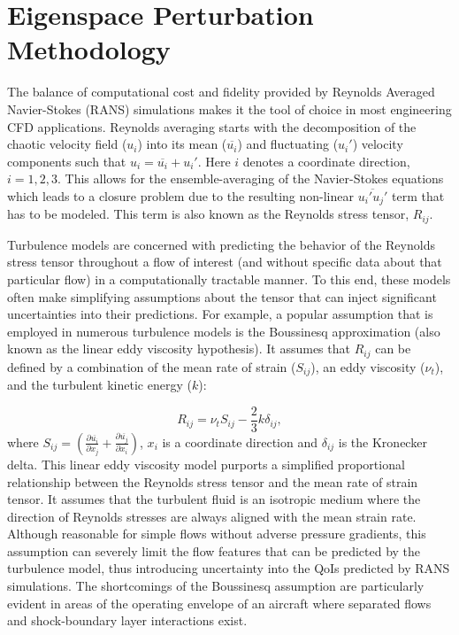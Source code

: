 \section{Eigenspace Perturbation Methodology} \label{sec:equips_rans_uq}

The balance of computational cost and fidelity provided by Reynolds Averaged Navier-Stokes (RANS) simulations makes it the tool of choice in most engineering CFD applications. Reynolds averaging starts with the decomposition of the chaotic velocity field ($ u_i$) into its mean ($\overline{u_i}$) and fluctuating ($u_i'$) velocity components such that $u_i = \overline{u_i} + u_i'$. Here $i$ denotes a coordinate direction, $i=1, 2, 3$. This allows for the ensemble-averaging of the Navier-Stokes equations \cite{pope_2000} which leads to a closure problem due to the resulting non-linear $\overline{u_i'u_j'}$ term that has to be modeled. This term is also known as the Reynolds stress tensor, $R_{ij}$.

Turbulence models are concerned with predicting the behavior of the Reynolds stress tensor throughout a flow of interest (and without specific data about that particular flow) in a computationally tractable manner. To this end, these models often make simplifying assumptions about the tensor that can inject significant uncertainties into their predictions. For example, a popular assumption that is employed in numerous turbulence models is the Boussinesq approximation (also known as the linear eddy viscosity hypothesis). It assumes that $R_{ij}$ can be defined by a combination of the mean rate of strain ($S_{ij}$), an eddy viscosity ($\nu_t$), and the turbulent kinetic energy ($k$):
 
 \begin{equation}\label{equ:rst}
     R_{ij} = \nu_t S_{ij} - \frac{2}{3} k \delta_{ij},
 \end{equation}
where $S_{ij} = \left ( \frac{\partial \overline{u_i}}{\partial x_j} + \frac{\partial \overline{u_j}}{\partial x_i} \right )$, $x_i$ is a coordinate direction and $\delta_{ij}$ is the Kronecker delta. This linear eddy viscosity model purports a simplified proportional relationship between the Reynolds stress tensor and the mean rate of strain tensor. It assumes that the turbulent fluid is an isotropic medium where the direction of Reynolds stresses are always aligned with the mean strain rate. Although reasonable for simple flows without adverse pressure gradients, this assumption can severely limit the flow features that can be predicted by the turbulence model, thus introducing uncertainty into the QoIs predicted by RANS simulations. The shortcomings of the Boussinesq assumption are particularly evident in areas of the operating envelope of an aircraft where separated flows and shock-boundary layer interactions exist. 

